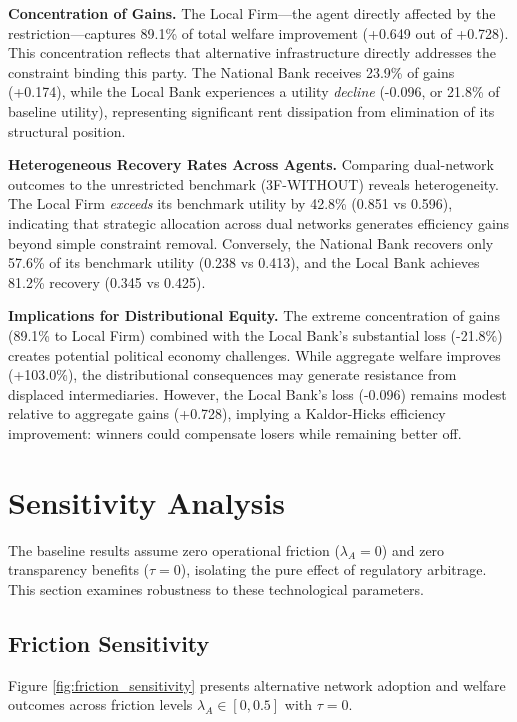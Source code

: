 \documentclass[12pt]{article}
\begin{document}
\textbf{Concentration of Gains.} The Local Firm---the agent directly affected by the restriction---captures 89.1\% of total welfare improvement (+0.649 out of +0.728). This concentration reflects that alternative infrastructure directly addresses the constraint binding this party. The National Bank receives 23.9\% of gains (+0.174), while the Local Bank experiences a utility \textit{decline} (-0.096, or 21.8\% of baseline utility), representing significant rent dissipation from elimination of its structural position.

\textbf{Heterogeneous Recovery Rates Across Agents.} Comparing dual-network outcomes to the unrestricted benchmark (3F-WITHOUT) reveals heterogeneity. The Local Firm \textit{exceeds} its benchmark utility by 42.8\% (0.851 vs 0.596), indicating that strategic allocation across dual networks generates efficiency gains beyond simple constraint removal. Conversely, the National Bank recovers only 57.6\% of its benchmark utility (0.238 vs 0.413), and the Local Bank achieves 81.2\% recovery (0.345 vs 0.425). 

\textbf{Implications for Distributional Equity.} The extreme concentration of gains (89.1\% to Local Firm) combined with the Local Bank's substantial loss (-21.8\%) creates potential political economy challenges. While aggregate welfare improves (+103.0\%), the distributional consequences may generate resistance from displaced intermediaries. However, the Local Bank's loss (-0.096) remains modest relative to aggregate gains (+0.728), implying a Kaldor-Hicks efficiency improvement: winners could compensate losers while remaining better off.

\section{Sensitivity Analysis}
\label{sec:sensitivity}

The baseline results assume zero operational friction ($\lambda_A = 0$) and zero transparency benefits ($\tau = 0$), isolating the pure effect of regulatory arbitrage. This section examines robustness to these technological parameters.

\subsection{Friction Sensitivity}

Figure \ref{fig:friction_sensitivity} presents alternative network adoption and welfare outcomes across friction levels $\lambda_A \in [0, 0.5]$ with $\tau = 0$.
\end{document}
